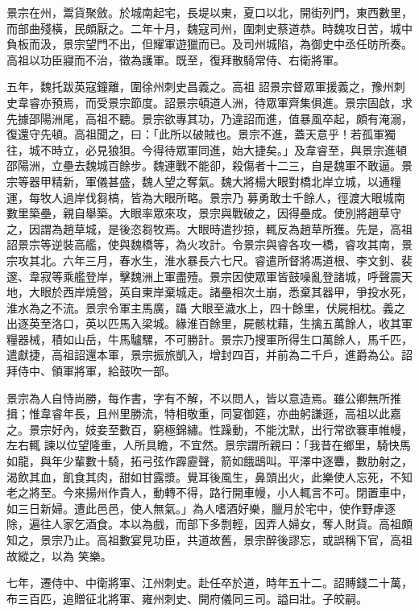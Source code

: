 \begin{pinyinscope}
 景宗在州，鬻貨聚斂。於城南起宅，長堤以東，夏口以北，開街列門，東西數里，而部曲殘橫，民頗厭之。二年十月，魏寇司州，圍刺史蔡道恭。時魏攻日苦，城中負板而汲，景宗望門不出，但耀軍遊獵而已。及司州城陷，為御史中丞任昉所奏。高祖以功臣寢而不治，徵為護軍。既至，復拜散騎常侍、右衛將軍。



 五年，魏托跋英寇鐘離，圍徐州刺史昌義之。高祖
 詔景宗督眾軍援義之，豫州刺史韋睿亦預焉，而受景宗節度。詔景宗頓道人洲，待眾軍齊集俱進。景宗固啟，求先據邵陽洲尾，高祖不聽。景宗欲專其功，乃違詔而進，值暴風卒起，頗有淹溺，復還守先頓。高祖聞之，曰：「此所以破賊也。景宗不進，蓋天意乎！若孤軍獨往，城不時立，必見狼狽。今得待眾軍同進，始大捷矣。」及韋睿至，與景宗進頓邵陽洲，立壘去魏城百餘步。魏連戰不能卻，殺傷者十二三，自是魏軍不敢逼。景宗等器甲精新，軍儀甚盛，魏人望之奪氣。魏大將楊大眼對橋北岸立城，以通糧運，每牧人過岸伐芻槁，皆為大眼所略。景宗乃
 募勇敢士千餘人，徑渡大眼城南數里築壘，親自舉築。大眼率眾來攻，景宗與戰破之，因得壘成。使別將趙草守之，因謂為趙草城，是後恣芻牧焉。大眼時遣抄掠，輒反為趙草所獲。先是，高祖詔景宗等逆裝高艦，使與魏橋等，為火攻計。令景宗與睿各攻一橋，睿攻其南，景宗攻其北。六年三月，春水生，淮水暴長六七尺。睿遣所督將馮道根、李文釗、裴邃、韋寂等乘艦登岸，擊魏洲上軍盡殪。景宗因使眾軍皆鼓噪亂登諸城，呼聲震天地，大眼於西岸燒營，英自東岸棄城走。諸壘相次土崩，悉棄其器甲，爭投水死，淮水為之不流。景宗令軍主馬廣，躡
 大眼至濊水上，四十餘里，伏屍相枕。義之出逐英至洛口，英以匹馬入梁城。緣淮百餘里，屍骸枕藉，生擒五萬餘人，收其軍糧器械，積如山岳，牛馬驢騾，不可勝計。景宗乃搜軍所得生口萬餘人，馬千匹，遣獻捷，高祖詔還本軍，景宗振旅凱入，增封四百，并前為二千戶，進爵為公。詔拜侍中、領軍將軍，給鼓吹一部。



 景宗為人自恃尚勝，每作書，字有不解，不以問人，皆以意造焉。雖公卿無所推揖；惟韋睿年長，且州里勝流，特相敬重，同宴御筵，亦曲躬謙遜，高祖以此嘉之。景宗好內，妓妾至數百，窮極錦繡。性躁動，不能沈默，出行常欲褰車帷幔，左右輒
 諫以位望隆重，人所具瞻，不宜然。景宗謂所親曰：「我昔在鄉里，騎快馬如龍，與年少輩數十騎，拓弓弦作霹靂聲，箭如餓鴟叫。平澤中逐麞，數肋射之，渴飲其血，飢食其肉，甜如甘露漿。覺耳後風生，鼻頭出火，此樂使人忘死，不知老之將至。今來揚州作貴人，動轉不得，路行開車幔，小人輒言不可。閉置車中，如三日新婦。遭此邑邑，使人無氣。」為人嗜酒好樂，臘月於宅中，使作野虖逐除，遍往人家乞酒食。本以為戲，而部下多剽輕，因弄人婦女，奪人財貨。高祖頗知之，景宗乃止。高祖數宴見功臣，共道故舊，景宗醉後謬忘，或誤稱下官，高祖故縱之，以為
 笑樂。



 七年，遷侍中、中衛將軍、江州刺史。赴任卒於道，時年五十二。詔賻錢二十萬，布三百匹，追贈征北將軍、雍州刺史、開府儀同三司。謚曰壯。子皎嗣。




\end{pinyinscope}
